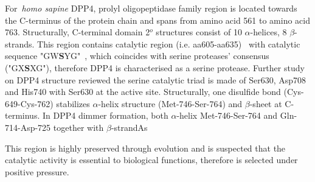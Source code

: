 For~\textit{homo sapine} DPP4, prolyl oligopeptidase family region is located towards the C-terminus of the protein chain and spans from amino acid 561 to amino acid 763. Structurally, C-terminal domain 2$^{o}$ structures consist of 10 $\alpha$-helices, 8 $\beta$-strands. This region contains catalytic region (i.e. aa605-aa635)~\cite{Rawlings1991,Barrett1992,Polgár1992,Rawlings1994} with catalytic sequence "GW\textbf{S}YG"~\cite{Ogata_1992}, which coincides with serine proteases' consensus ("GX\textbf{S}XG"), therefore DPP4 is characterised as a serine protease. Further study on DPP4 structure reviewed the serine catalytic triad is made of Ser630, Asp708 and His740 with Ser630 at the active site. Structurally, one disulfide bond (Cys-649-Cys-762) stabilizes $\alpha$-helix structure (Met-746-Ser-764) and $\beta$-sheet at C-terminus. In DPP4 dimmer formation, both $\alpha$-helix Met-746-Ser-764 and Gln-714-Asp-725 together with $\beta$-strandAs
\par
This region is highly preserved through evolution and is suspected that the catalytic activity is essential to biological functions, therefore is selected under positive pressure. 